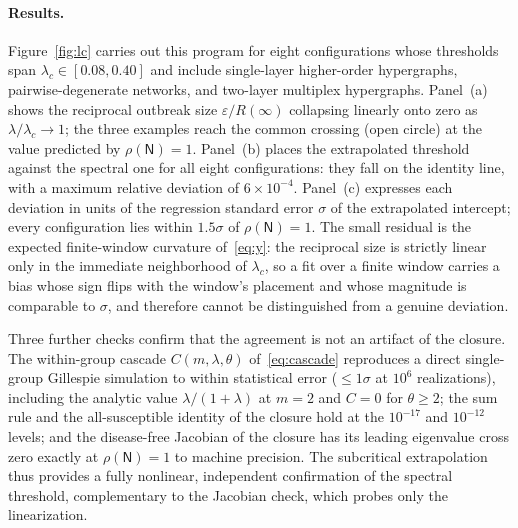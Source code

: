 \documentclass[11pt]{article}
\newcommand{\Nmat}{\mathsf{N}}
\newcommand{\lc}{\lambda_c}
\newcommand{\Rinf}{R(\infty)}
\begin{document}
\paragraph{Results.}
Figure~\ref{fig:lc} carries out this program for eight configurations whose
thresholds span $\lc\in[0.08,0.40]$ and include single-layer higher-order
hypergraphs, pairwise-degenerate networks, and two-layer multiplex hypergraphs.
Panel~(a) shows the reciprocal outbreak size $\varepsilon/\Rinf$ collapsing
linearly onto zero as $\lambda/\lc\to1$; the three examples reach the common
crossing (open circle) at the value predicted by $\rho(\Nmat)=1$. Panel~(b)
places the extrapolated threshold against the spectral one for all eight
configurations: they fall on the identity line, with a maximum relative
deviation of $6\times10^{-4}$. Panel~(c) expresses each deviation in units of
the regression standard error $\sigma$ of the extrapolated intercept; every
configuration lies within $1.5\sigma$ of $\rho(\Nmat)=1$. The small residual is
the expected finite-window curvature of~\eqref{eq:y}: the reciprocal size is
strictly linear only in the immediate neighborhood of $\lc$, so a fit over a
finite window carries a bias whose sign flips with the window's placement and
whose magnitude is comparable to $\sigma$, and therefore cannot be distinguished
from a genuine deviation.

Three further checks confirm that the agreement is not an artifact of the
closure. The within-group cascade $C(m,\lambda,\theta)$ of~\eqref{eq:cascade}
reproduces a direct single-group Gillespie simulation to within statistical
error ($\le\!1\sigma$ at $10^6$ realizations), including the analytic value
$\lambda/(1+\lambda)$ at $m=2$ and $C=0$ for $\theta\ge2$; the sum rule and the
all-susceptible identity of the closure hold at the $10^{-17}$ and $10^{-12}$
levels; and the disease-free Jacobian of the closure has its leading eigenvalue
cross zero exactly at $\rho(\Nmat)=1$ to machine precision. The subcritical
extrapolation thus provides a fully nonlinear, independent confirmation of the
spectral threshold, complementary to the Jacobian check, which probes only the
linearization.
\end{document}
